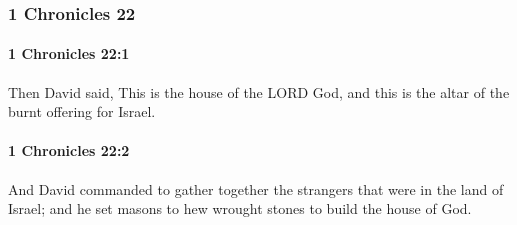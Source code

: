 	\subsubsection{1 Chronicles 22} %
		\label{1CHRONICLES-22}

		\paragraph{1 Chronicles 22:1} %
			\label{1CHRONICLES-22-1}

			Then David said, This is the house of the LORD God, and this is the altar of the burnt offering for Israel.


		\paragraph{1 Chronicles 22:2} %
			\label{1CHRONICLES-22-2}

			And David commanded to gather together the strangers that were in the land of Israel; and he set masons to hew wrought stones to build the house of God.

